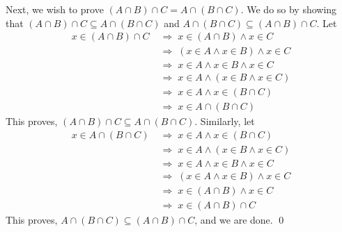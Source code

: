 \documentclass[10pt]{article}
\begin{document}
\begin{enumerate}
                Next, we wish to prove $(A \cap B) \cap C = A \cap (B \cap C)$. We do so by showing that $(A \cap B) \cap C \subseteq A \cap (B \cap C)$
                and $A \cap (B \cap C) \subseteq (A \cap B) \cap C$. Let
                \begin{align*}
                        x \in (A \cap B) \cap C
                                \;&\Rightarrow\; x \in (A \cap B) \land x \in C\\
                                \;&\Rightarrow\; (x \in A \land x \in B) \land x \in C\\
                                \;&\Rightarrow\; x \in A \land x \in B \land x \in C\\
                                \;&\Rightarrow\; x \in A \land (x \in B \land x \in C)\\
                                \;&\Rightarrow\; x \in A \land x \in (B \cap C)\\
                                \;&\Rightarrow\; x \in A \cap (B \cap C)
                \end{align*}
                This proves, $(A \cap B) \cap C \subseteq A \cap (B \cap C)$. Similarly, let
                \begin{align*}
                        x \in A \cap (B \cap C)
                                \;&\Rightarrow\; x \in A \land x \in (B \cap C)\\
                                \;&\Rightarrow\; x \in A \land (x \in B \land x \in C)\\
                                \;&\Rightarrow\; x \in A \land x \in B \land x \in C\\
                                \;&\Rightarrow\; (x \in A \land x \in B) \land x \in C\\
                                \;&\Rightarrow\; x \in (A \cap B) \land x \in C\\
                                \;&\Rightarrow\; x \in (A \cap B) \cap C
                \end{align*}
                This proves, $A \cap (B \cap C) \subseteq (A \cap B) \cap C$, and we are done. \qed


\end{enumerate}
\end{document}
